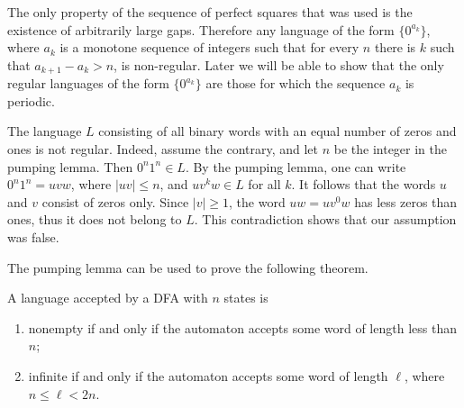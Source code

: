 \begin{page}


The only property of the sequence of perfect squares that was used is the existence of arbitrarily large gaps.
Therefore any language of the form $\{0^{a_k}\}$,
where $a_k$ is a monotone sequence of integers such that for every $n$ there is $k$ such that $a_{k+1} - a_k > n$, is non-regular.
Later we will be able to show that the only regular languages of the form $\{0^{a_k}\}$ are those for which the sequence $a_k$ is periodic.


\end{page}

\begin{page}

\begin{exl}
The language $L$ consisting of all binary words with an equal number of zeros and ones is not regular.
Indeed, assume the contrary, and let $n$ be the integer in the pumping lemma.
Then $0^n1^n \in L$.
By the pumping lemma, one can write $0^n1^n = uvw$, where $|uv| \le n$, and $uv^kw \in L$ for all $k$.
It follows that the words $u$ and $v$ consist of zeros only.
Since $|v| \ge 1$, the word $uw = uv^0w$ has less zeros than ones, thus it does not belong to $L$.
This contradiction shows that our assumption was false.
\end{exl}

\end{page}

\begin{page}



The pumping lemma can be used to prove the following theorem.


\end{page}

\begin{page}

\begin{thm}
A language accepted by a DFA with $n$ states is
\begin{enumerate}
\item
nonempty if and only if the automaton accepts some word of length less than $n$;
\item
infinite if and only if the automaton accepts some word of length $\ell$, where $n \le \ell < 2n$.
\end{enumerate}
\end{thm}

\end{page}

